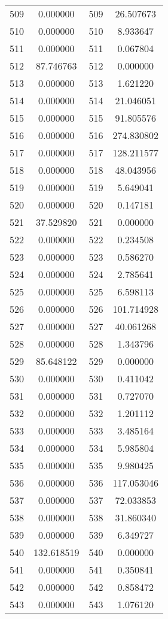 \documentclass[12pt]{article}
\begin{document}
\begin{longtable}{@{}cccc@{}}
509 & 0.000000 & 509 & 26.507673 \\
510 & 0.000000 & 510 & 8.933647 \\
511 & 0.000000 & 511 & 0.067804 \\
512 & 87.746763 & 512 & 0.000000 \\
513 & 0.000000 & 513 & 1.621220 \\
514 & 0.000000 & 514 & 21.046051 \\
515 & 0.000000 & 515 & 91.805576 \\
516 & 0.000000 & 516 & 274.830802 \\
517 & 0.000000 & 517 & 128.211577 \\
518 & 0.000000 & 518 & 48.043956 \\
519 & 0.000000 & 519 & 5.649041 \\
520 & 0.000000 & 520 & 0.147181 \\
521 & 37.529820 & 521 & 0.000000 \\
522 & 0.000000 & 522 & 0.234508 \\
523 & 0.000000 & 523 & 0.586270 \\
524 & 0.000000 & 524 & 2.785641 \\
525 & 0.000000 & 525 & 6.598113 \\
526 & 0.000000 & 526 & 101.714928 \\
527 & 0.000000 & 527 & 40.061268 \\
528 & 0.000000 & 528 & 1.343796 \\
529 & 85.648122 & 529 & 0.000000 \\
530 & 0.000000 & 530 & 0.411042 \\
531 & 0.000000 & 531 & 0.727070 \\
532 & 0.000000 & 532 & 1.201112 \\
533 & 0.000000 & 533 & 3.485164 \\
534 & 0.000000 & 534 & 5.985804 \\
535 & 0.000000 & 535 & 9.980425 \\
536 & 0.000000 & 536 & 117.053046 \\
537 & 0.000000 & 537 & 72.033853 \\
538 & 0.000000 & 538 & 31.860340 \\
539 & 0.000000 & 539 & 6.349727 \\
540 & 132.618519 & 540 & 0.000000 \\
541 & 0.000000 & 541 & 0.350841 \\
542 & 0.000000 & 542 & 0.858472 \\
543 & 0.000000 & 543 & 1.076120 \\

\end{longtable}
\end{document}
